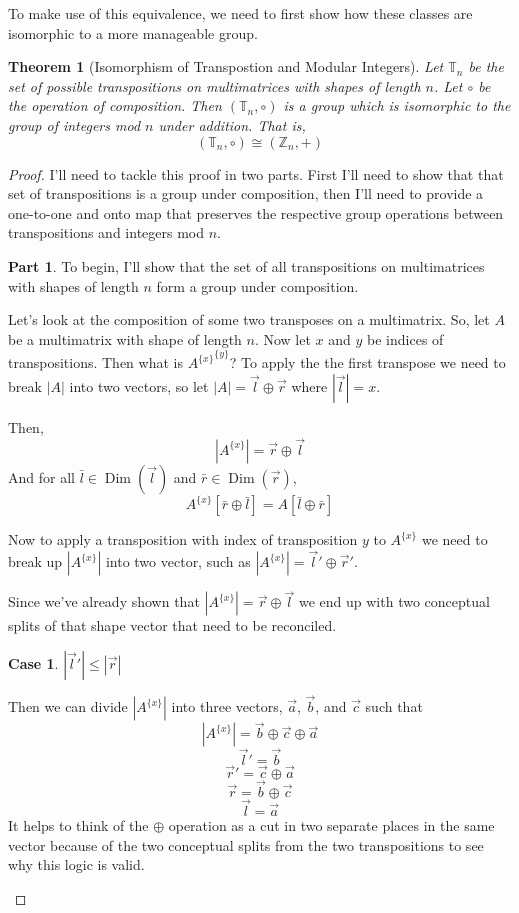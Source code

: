 \documentclass[12pt]{book}
\theoremstyle{plain}
\newtheorem{theorem}{Theorem}[chapter]
\theoremstyle{definition}
\theoremstyle{ppart}
\newtheorem{ppart}{Part}
\theoremstyle{case}
\newtheorem{case}{Case}
\theoremstyle{solution}
\DeclareMathOperator{\Dim}{Dim}
\newcommand{\shape}[1]{\left|#1\right|}
\newcommand{\transpose}[2]{{#1}^{\{#2\}}}
\begin{document}
To make use of this equivalence, we need to first show how these classes are
isomorphic \cite{book:abstract} to a more manageable group.

\begin{theorem}[Isomorphism of Transpostion and Modular Integers]
\label{tran_int_iso}
Let $\mathbb{T}_n$ be the set of possible transpositions on multimatrices with
shapes of length $n$. Let $\circ$ be the operation of composition. Then
$(\mathbb{T}_n, \circ)$ is a group which is isomorphic to the group of
integers mod $n$ under addition. That is,
\[ (\mathbb{T}_n, \circ) \cong (\mathbb{Z}_n, +) \]
\end{theorem}
\begin{proof}
I'll need to tackle this proof in two parts. First I'll need to show that
that set of transpositions is a group under composition, then I'll need to
provide a one-to-one and onto map that preserves the respective group operations
between transpositions and integers mod $n$.

\begin{ppart}
To begin, I'll show that the set of all transpositions on multimatrices 
with shapes of length $n$ form a group under composition.

Let's look at the composition of some two transposes on a multimatrix.
So, let $A$ be a multimatrix with shape of length $n$. Now let $x$ and $y$
be indices of transpositions. Then what is $\transpose{\transpose{A}{x}}{y}$?
To apply the the first transpose we need to break $\shape{A}$ into two vectors,
so let $\shape{A} = \vec{l} \oplus \vec{r}$ where $\shape{\vec{l}} = x$.

Then,
\[ \shape{\transpose{A}{x}} = \vec{r} \oplus \vec{l} \]
And for all
$\bar{l} \in \Dim(\vec{l})$ and $\bar{r} \in \Dim(\vec{r})$,
\[ \transpose{A}{x}[\bar{r} \oplus \bar{l}] = A[\bar{l} \oplus \bar{r}] \]

Now to apply a transposition with index of transposition $y$ to $\transpose{A}{x}$
we need to break up $\shape{\transpose{A}{x}}$ into two vector, such as
$\shape{\transpose{A}{x}} = \vec{l}' \oplus \vec{r}'$.

Since we've already shown that $\shape{\transpose{A}{x}} = \vec{r} \oplus \vec{l}$
we end up with two conceptual splits of that shape vector that need to
be reconciled.

\begin{case} $\shape{\vec{l}'} \le \shape{\vec{r}}$

Then we can divide $\shape{\transpose{A}{x}}$ into three vectors, $\vec{a}$, $\vec{b}$, and $\vec{c}$
such that
\[ \shape{\transpose{A}{x}} = \vec{b} \oplus \vec{c} \oplus \vec{a} \]
\[ \vec{l}' = \vec{b} \]
\[ \vec{r}' = \vec{c} \oplus \vec{a} \]
\[ \vec{r} = \vec{b} \oplus \vec{c} \]
\[ \vec{l} = \vec{a} \]
It helps to think of the $\oplus$ operation as a cut in two separate places in the same
vector because of the two conceptual splits from the two transpositions to see why this
logic is valid.


\end{case}
\end{ppart}
\end{proof}
\end{document}
